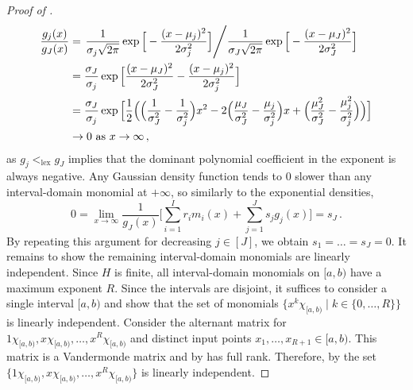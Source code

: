 \documentclass[a4paper,UKenglish,cleveref, autoref,mathscr]{lipics-v2019}
\newcommand{\1}{\mathbbm{1}}
\begin{document}
\begin{proof}[Proof of ]
\begin{equation*}
	\begin{split}
		\frac{g_j(x)}{g_J(x)} & = \left. \frac{1}{\sigma_j\sqrt{2\pi}} \exp\Big[ - \frac{(x - \mu_j)^2}{2\sigma_j^2}\Big] \middle/ \frac{1}{\sigma_J\sqrt{2\pi}} \exp\Big[- \frac{(x - \mu_J)^2}{2\sigma_J^2}\Big] \right. \\
		& = \frac{\sigma_J}{\sigma_j} \exp{\Big[ \frac{(x - \mu_J)^2}{2\sigma_J^2} - \frac{(x - \mu_j)^2}{2\sigma_j^2} \Big]} \\
		& = \frac{\sigma_J}{\sigma_j} \exp\Big[\frac{1}{2}\Big( \Big(\frac{1}{\sigma_J^2} - \frac{1}{\sigma_j^2} \Big)x^2 - 2\Big( \frac{\mu_J}{\sigma_J^2} - \frac{\mu_j}{\sigma_j^2}\Big)x  + \Big( \frac{\mu_J^2}{\sigma_J^2} - \frac{\mu_j^2}{\sigma_j^2}\Big)\Big)\Big]\\
		& \rightarrow 0 \text{ as } x \rightarrow \infty\,,
	\end{split}
\end{equation*}
as $g_j <_{\text{lex}} g_J$ implies that the dominant polynomial coefficient in the exponent is always negative. Any Gaussian density function tends to $0$ slower than any interval-domain monomial at $+\infty$, so similarly to the exponential densities,
\begin{equation*}
	0 = \lim_{x \rightarrow \infty} \frac{1}{g_J(x)}\Big[\sum_{i = 1}^{I} r_i m_i(x) + \sum_{j = 1}^J s_j g_j(x)\Big] = s_J\,.
\end{equation*}
By repeating this argument for decreasing $j \in [J]$, we obtain $s_1 = \dots = s_J = 0$. It remains to show the remaining interval-domain monomials are linearly independent. Since $H$ is finite, all interval-domain monomials on $[a,b)$ have a maximum exponent $R$. Since the intervals are disjoint, it suffices to consider a single interval $[a,b)$ and show that the set of monomials $\{x^k\chi_{[a,b)} \mid k \in \{0, \dots, R\}\}$ is linearly independent.
Consider the alternant matrix for $1\chi_{[a,b)}, x\chi_{[a,b)}, \dots, x^R\chi_{[a,b)}$ and distinct input points $x_1, \dots, x_{R + 1} \in [a,b)$. This matrix is a Vandermonde matrix and by \cite[p.9]{milne33} has full rank. Therefore, by  the set $\{1\chi_{[a,b)}, x\chi_{[a,b)}, \dots, x^R\chi_{[a,b)}\}$ is linearly independent.
\end{proof}
\end{document}

